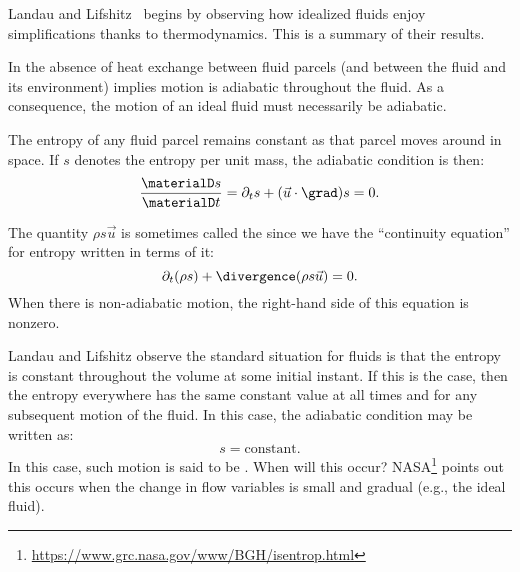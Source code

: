 \begin{node}\label{fluids:euler-flow-000M}%
Landau and Lifshitz~\cite[\S3]{landau1987fluids} begins by observing how
idealized fluids enjoy simplifications thanks to thermodynamics. This is
a summary of their results.

\begin{node}\label{fluids:euler-flow-000G}%
In the absence of heat exchange between fluid parcels (and between the
fluid and its environment) implies motion is adiabatic throughout the
fluid.  As a consequence, the motion of an ideal fluid must necessarily
be adiabatic.

\begin{corollary}\label{fluids:euler-flow-000H}%
The entropy of any fluid parcel remains constant as that parcel moves
around in space. If $s$ denotes the entropy per unit mass, the adiabatic
condition is then:
\begin{equation*}
\frac{\materialD s}{\materialD t}=\partial_{t}s+(\vec{u}\cdot\grad)s=0.
\end{equation*}
\end{corollary} %

\begin{definition}\label{fluids:euler-flow-000I}%
The quantity $\rho s\vec{u}$ is sometimes called the
 since we have the ``continuity equation''
for entropy written in terms of it:
\begin{equation*}
\partial_{t}(\rho s)+\divergence(\rho s\vec{u})=0.
\end{equation*}
When there is non-adiabatic motion, the right-hand side of this equation
is nonzero.
\end{definition}
\end{node} %

\begin{node}\label{fluids:euler-flow-000J}%
Landau and Lifshitz observe the standard situation for fluids is that
the entropy is constant throughout the volume at some initial
instant. If this is the case, then the entropy everywhere has the same
constant value at all times and for any subsequent motion of the
fluid. In this case, the adiabatic condition may be written as:
\begin{equation*}
s=\mbox{constant}.
\end{equation*}
In this case, such motion is said to be . When will
this occur? NASA\footnote{\url{https://www.grc.nasa.gov/www/BGH/isentrop.html}} points out this occurs when the change
in flow variables is small and gradual (e.g., the ideal fluid).
\end{node} %


\end{node}

